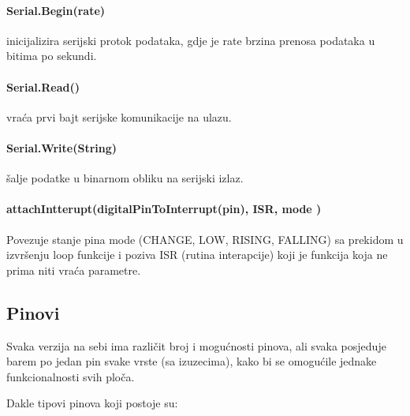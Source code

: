 \documentclass[../Document.tex]{subfiles}
\begin{document}
\paragraph{Serial.Begin(rate)} inicijalizira serijski protok podataka, gdje je rate brzina prenosa podataka u bitima po sekundi.

\paragraph{Serial.Read()} vraća prvi bajt serijske komunikacije na ulazu.

\paragraph{Serial.Write(String)} šalje podatke u binarnom obliku na serijski izlaz.

\paragraph{attachIntterupt(digitalPinToInterrupt(pin), ISR, mode )} Povezuje stanje pina mode (CHANGE, LOW, RISING, FALLING) sa prekidom u izvršenju loop funkcije i poziva ISR (rutina interapcije) koji je funkcija koja ne prima niti vraća parametre.


\subsection{Pinovi}\label{arduinopinovi}

Svaka verzija na sebi ima različit broj i mogućnosti pinova, ali svaka posjeduje barem po jedan pin svake vrste (sa izuzecima), kako bi se omogućile jednake funkcionalnosti svih ploča.

\noindent Dakle tipovi pinova koji postoje su:
\end{document}
